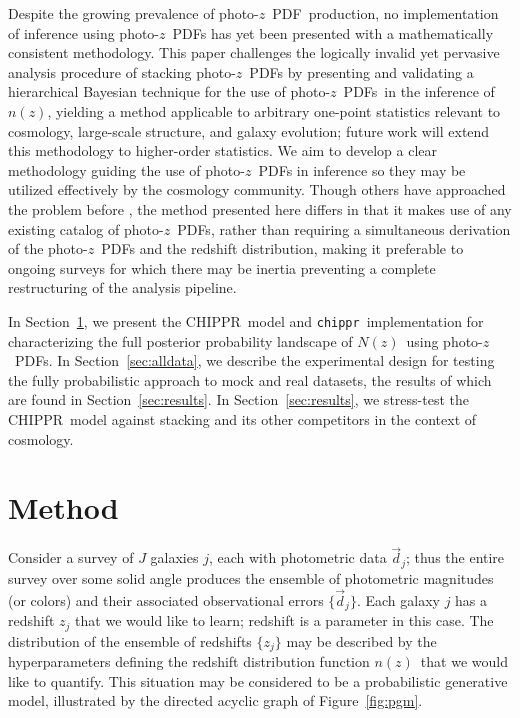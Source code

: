 \documentclass[iop]{emulateapj}
\newcommand{\Fig}[1]{Figure~\ref{#1}}
\newcommand{\project}[1]{\textsc{#1}}
\newcommand{\Chippr}{\project{CHIPPR}}%
\newcommand{\repo}[1]{\texttt{#1}}
\newcommand{\chippr}{\repo{chippr}}
\newcommand{\data}{\ensuremath{\vec{d}}}%
\newcommand{\pz}{photo-$z$}
\newcommand{\pzpdf}{\pz\ PDF}%
\newcommand{\nz}{$n(z)$}
\newcommand{\Nz}{$N(z)$}
\begin{document}
Despite the growing prevalence of \pzpdf\ production, no implementation of inference using \pzpdf s has yet been presented with a mathematically consistent methodology.  
This paper challenges the logically invalid yet pervasive analysis procedure of stacking \pzpdf s by presenting and validating a hierarchical Bayesian technique for the use of \pzpdf s\ in the inference of \nz, yielding a method applicable to arbitrary one-point statistics relevant to cosmology, large-scale structure, and galaxy evolution; future work will extend this methodology to higher-order statistics.
We aim to develop a clear methodology guiding the use of \pzpdf s in inference so they may be utilized effectively by the cosmology community.
Though others have approached the problem before \citep{leistedt_hierarchical_2016, leistedt_hierarchical_2018}, the method presented here differs in that it makes use of any existing catalog of \pzpdf s, rather than requiring a simultaneous derivation of the \pzpdf s and the redshift distribution, making it preferable to ongoing surveys for which there may be inertia preventing a complete restructuring of the analysis pipeline.

In Section~\ref{sec:meth}, we present the \Chippr\ model and \chippr\ implementation for characterizing the full posterior probability landscape of \Nz\ using \pzpdf s. 
In Section~\ref{sec:alldata}, we describe the experimental design for testing the fully probabilistic approach to mock and real datasets, the results of which are found in Section~\ref{sec:results}.
In Section~\ref{sec:results}, we stress-test the \Chippr\ model against stacking and its other competitors in the context of cosmology.

\section{Method}
\label{sec:meth}

Consider a survey of $J$ galaxies $j$, each with photometric data $\data_{j}$; thus the entire survey over some solid angle produces the ensemble of photometric magnitudes (or colors) and their associated observational errors $\{\data_{j}\}$.  
Each galaxy $j$ has a redshift $z_{j}$ that we would like to learn; redshift is a parameter in this case.  
The distribution of the ensemble of redshifts $\{z_{j}\}$ may be described by the hyperparameters defining the redshift distribution function \nz\ that we would like to quantify.  
This situation may be considered to be a probabilistic generative model, illustrated by the directed acyclic graph of \Fig{fig:pgm}.  
\end{document}
